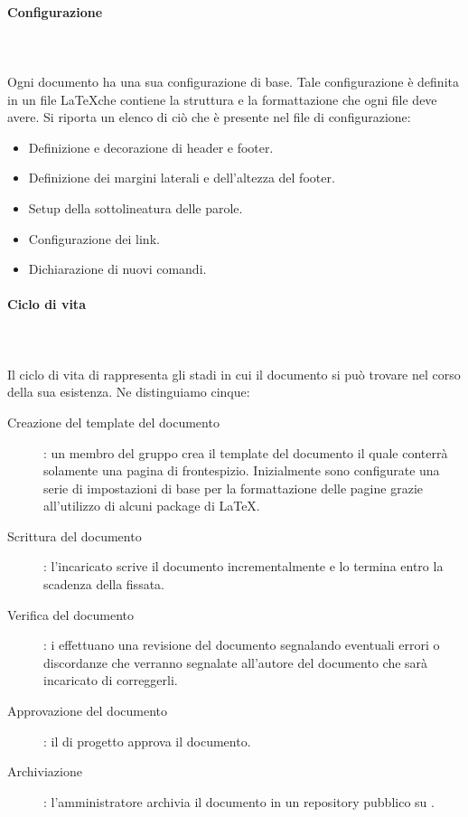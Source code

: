 \documentclass[../norme-di-progetto.tex]{subfiles}
\begin{document}
\paragraph{Configurazione} \mbox{}\\
\label{par:configurazione}
\\Ogni documento ha una sua configurazione di base. Tale configurazione è definita in un file \LaTeX  che contiene la struttura e la formattazione che ogni file deve avere. Si riporta un elenco di ciò che è presente nel file di configurazione:
\begin{itemize}
	\item Definizione e decorazione di header e footer.
	\item Definizione dei margini laterali e dell'altezza del footer.
	\item Setup della sottolineatura delle parole.
	\item Configurazione dei link.
	\item Dichiarazione di nuovi comandi.
\end{itemize}
\paragraph{Ciclo di vita}\mbox{}\\
\label{par:ciclo di vita}
\\Il ciclo di vita di rappresenta gli stadi in cui il documento si può trovare nel corso della sua esistenza. Ne distinguiamo cinque:
\begin{description}
	\item [Creazione del template del documento]: un membro del gruppo crea il template del documento il quale conterrà solamente una pagina di frontespizio. Inizialmente sono configurate una serie di impostazioni di base per la formattazione delle pagine grazie all'utilizzo di alcuni package di \LaTeX.
	\item [Scrittura del documento]: l'incaricato scrive il documento incrementalmente e lo termina entro la scadenza della  fissata.
	\item [Verifica del documento]: i  effettuano una revisione del documento segnalando eventuali errori o discordanze che verranno segnalate all'autore del documento che sarà incaricato di correggerli.
	\item [Approvazione del documento]: il  di progetto approva il documento.
	\item [Archiviazione]: l'amministratore archivia il documento in un repository pubblico su .
\end{description}
\end{document}
